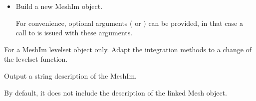 \documentclass[a4paper,11pt,english]{sphinxmanual}
\begin{document}
\begin{fulllineitems}
\begin{itemize}
\begin{quote}
“a+b+c” is the union of their domains.

“c\sphinxhyphen{}(a+b)” is the domain of the third levelset minus the union of
the domains of the two others.

“!a” is the complementary of the domain of a (i.e. it is the
domain where a(x)\textgreater{}0)

The first levelset is always referred to with “a”, the second
with “b”, and so on.
\end{quote}

for intance INSIDE(a*b*c)

CAUTION: this integration method will be defined only on the element
cut by the level\sphinxhyphen{}set. For the ‘ALL’, ‘INSIDE’ and ‘OUTSIDE’ options
it is mandatory to use the method  to define
the integration method on the remaining elements.

\item {} 
Build a new MeshIm object.

For convenience, optional arguments ( or ) can be
provided, in that case a call to  is issued
with these arguments.

\end{itemize}

\begin{fulllineitems}
\label{\detokenize{python/cmdref_MeshIm:getfem.MeshIm.adapt}}
For a MeshIm levelset object only. Adapt the integration methods to a
change of the levelset function.

\end{fulllineitems}


\begin{fulllineitems}
\label{\detokenize{python/cmdref_MeshIm:getfem.MeshIm.char}}
Output a string description of the MeshIm.

By default, it does not include the description of the linked
Mesh object.

\end{fulllineitems}


\end{fulllineitems}
\end{document}
